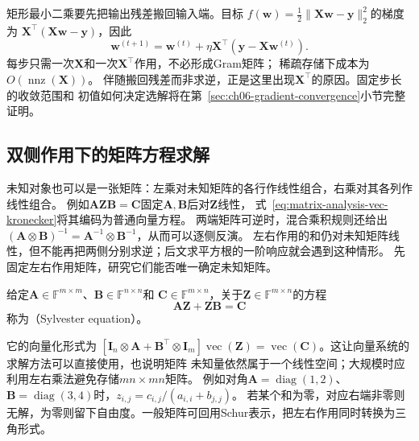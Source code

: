 矩形最小二乘要先把输出残差搬回输入端。目标
$f(\bm w)=\tfrac12\lVert\bm X\bm w-\bm y\rVert_2^2$的梯度为
$\bm X^\top(\bm X\bm w-\bm y)$，因此
\begin{equation}
 \bm w^{(t+1)}
 =\bm w^{(t)}+\eta\bm X^\top(\bm y-\bm X\bm w^{(t)}).
 \label{eq:ch06-least-squares-gradient-update}
\end{equation}
每步只需一次$\bm X$和一次$\bm X^\top$作用，不必形成Gram矩阵；
稀疏存储下成本为$O(\operatorname{nnz}(\bm X))$。
伴随搬回残差而非求逆，正是这里出现$\bm X^\top$的原因。固定步长的收敛范围和
初值如何决定选解将在第~\ref{sec:ch06-gradient-convergence}小节完整证明。

\subsection{双侧作用下的矩阵方程求解}
\label{sec:linear-algebra-matrix-equations}

未知对象也可以是一张矩阵：左乘对未知矩阵的各行作线性组合，右乘对其各列作线性组合。
例如$\bm A\bm Z\bm B=\bm C$固定$\bm A,\bm B$后对$\bm Z$线性，
式~\eqref{eq:matrix-analysis-vec-kronecker}将其编码为普通向量方程。
两端矩阵可逆时，混合乘积规则还给出
$(\bm A\otimes\bm B)^{-1}=\bm A^{-1}\otimes\bm B^{-1}$，从而可以逐侧反演。
左右作用的和仍对未知矩阵线性，但不能再把两侧分别求逆；后文求平方根的一阶响应就会遇到这种情形。
先固定左右作用矩阵，研究它们能否唯一确定未知矩阵。

\begin{definition}[Sylvester方程]
\label{def:matrix-analysis-sylvester-equation}
给定$\bm A\in\mathbb F^{m\times m}$、$\bm B\in\mathbb F^{n\times n}$和
$\bm C\in\mathbb F^{m\times n}$，关于$\bm Z\in\mathbb F^{m\times n}$的方程
\[
 \bm A\bm Z+\bm Z\bm B=\bm C
\]
称为（Sylvester equation）。
\end{definition}
它的向量化形式为
$[\bm I_n\otimes\bm A+\bm B^\top\otimes\bm I_m]\operatorname{vec}(\bm Z)
=\operatorname{vec}(\bm C)$。这让向量系统的求解方法可以直接使用，也说明矩阵
未知量依然属于一个线性空间；大规模时应利用左右乘法避免存储$mn\times mn$矩阵。
例如对角$\bm A=\operatorname{diag}(1,2)$、
$\bm B=\operatorname{diag}(3,4)$时，$z_{i,j}=c_{i,j}/(a_{i,i}+b_{j,j})$。
若某个和为零，对应右端非零则无解，为零则留下自由度。一般矩阵可回用Schur表示，把左右作用同时转换为三角形式。


